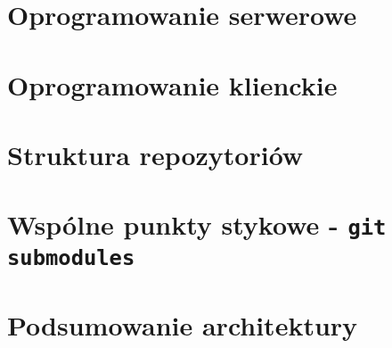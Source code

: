 \section{Oprogramowanie serwerowe}

\section{Oprogramowanie klienckie}

\section{Struktura repozytoriów}

\section{Wspólne punkty stykowe - \texttt{git submodules}}


\section{Podsumowanie architektury}

